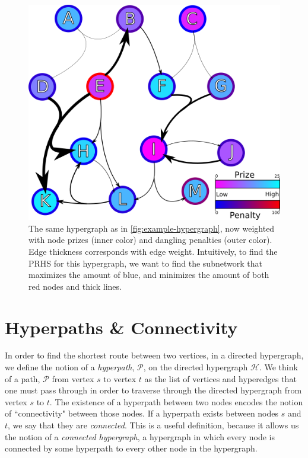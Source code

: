 \documentclass[12pt,twoside]{reedthesis}
\theoremstyle{definition}
\begin{document}
\begin{figure}[thbp]
  \begin{center}
    \includegraphics{example-hypergraph-weighted}
  \caption[A weighted hypergraph]{The same hypergraph as in \ref{fig:example-hypergraph}, now weighted with node prizes (inner color) and dangling penalties (outer color). Edge thickness corresponds with edge weight. Intuitively, to find the PRHS for this hypergraph, we want to find the subnetwork that maximizes the amount of blue, and minimizes the amount of both red nodes and thick lines.}
  \label{fig:example-hypergraph-weighted}
  \end{center}
\end{figure}

\section{Hyperpaths \& Connectivity}
In order to find the shortest route between two vertices, in a directed hypergraph, we define the notion of a \textit{hyperpath}, $\mathcal{P}$, on the directed hypergraph $\mathcal{H}$.  We think of a path, $\mathcal{P}$ from vertex $s$ to vertex $t$ as the list of vertices and hyperedges that one must pass through in order to traverse through the directed hypergraph from vertex $s$ to $t$. The existence of a hyperpath between two nodes encodes the notion of ``connectivity" between those nodes.  If a hyperpath exists between nodes $s$ and $t$, we say that they are \textit{connected}. This is a useful definition, because it allows us the notion of a \textit{connected hypergraph}, a hypergraph in which every node is connected by some hyperpath to every other node in the hypergraph.\par
\end{document}
